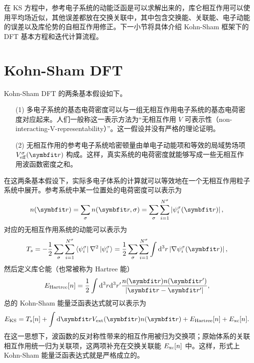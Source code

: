 在 KS 方程中，参考电子系统的动能泛函是可以求解出来的，库仑相互作用可以使用平均场近似，其他误差都放在交换关联中，其中包含交换能、关联能、电子动能的误差以及库伦势的自相互作用修正。下一小节将具体介绍 Kohn-Sham 框架下的 DFT 基本方程和迭代计算流程。
\section{Kohn-Sham DFT}
Kohn-Sham DFT 的两条基本假设如下。
\begin{itemize}
    \item[(1)] 多电子系统的基态电荷密度可以与一组无相互作用电子系统的基态电荷密度对应起来。人们一般称这一表示方法为“无相互作用 $V$ 可表示性（non-interacting-V-representability）”\cite{ENGLISCH1983253}。这一假设并没有严格的理论证明。
    \item[(2)] 无相互作用的参考电子系统哈密顿量由单电子动能项和等效的局域势场项 $V_{\fun{eff}}^{\sigma}(\vct{r})$ 构成。这样，真实系统的电荷密度就能够写成一些无相互作用波函数密度之和。
\end{itemize}

在这两条基本假设下，实际多电子体系的计算就可以等效地在一个无相互作用粒子系统中展开。参考系统中某一位置处的电荷密度可以表示为
\begin{equation}
    n(\vct{r})=\sum_{\sigma}n(\vct{r},\sigma)=\sum_{\sigma}\sum_{i=1}^{N^\sigma}\left| \psi_i^{\sigma}(\vct{r}) \right|,
\end{equation}
对应的无相互作用系统的动能可以表示为 
\begin{equation}
    T_s=-\frac{1}{2}\sum_{\sigma}\sum_{i=1}^{N^{\sigma}}\llag \psi_i^\sigma \right| \nabla^2 \left| \psi_i^\sigma \rrag = \frac{1}{2}\sum_{\sigma}\sum_{i=1}^{N^\sigma}\int\dd^3 r\left| \nabla \psi_i^\sigma (\vct{r}) \right|,
\end{equation}
然后定义库仑能（也常被称为 Hartree 能）
\begin{equation}
    E_{\fun{Hartree}}[n]=\frac{1}{2}\int\dd^3 r\dd^3 r' \frac{n(\vct{r})n(\vct{r}')}{|\vct{r}-\vct{r}'|},
\end{equation} 
总的 Kohn-Sham 能量泛函表达式就可以表示为 
\begin{equation}
    E_{\fun{KS}}=T_s[n]+\int\dd\vct{r}V_{\fun{ext}}(\vct{r})n(\vct{r})+E_{\fun{Hartree}}[n]+E_{\fun{xc}}[n].
\end{equation}
在这一思想下，波函数的反对称性带来的相互作用被归为交换项；原始体系的关联相互作用统一归为关联项，这两项补充在交换关联能 $E_{\mathrm{xc}}[n]$ 中。这样，形式上 Kohn-Sham 能量泛函表达式就是严格成立的。

